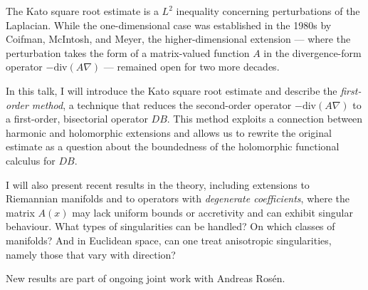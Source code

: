 {%
    The Kato square root estimate is a $L^2$ inequality concerning
    perturbations of the Laplacian. While the one-dimensional case was
    established in the 1980s by Coifman, McIntosh, and Meyer,
    the higher-dimensional extension --- where the perturbation takes the
    form of a matrix-valued function $A$ in the divergence-form operator
    $-\mathrm{div}(A \nabla)$ --- remained open for two more decades.

    In this talk, I will introduce the Kato square root estimate and
    describe the \emph{first-order method}, a technique that reduces the
    second-order operator $-\mathrm{div}(A \nabla)$ to a first-order,
    bisectorial operator $DB$. This method exploits a connection between
    harmonic and holomorphic extensions and allows us to rewrite the
    original estimate as a question about the boundedness of the
    holomorphic functional calculus for $D B$.

    I will also present recent results in the theory, including extensions
    to Riemannian manifolds and to operators with \emph{degenerate
    coefficients}, where the matrix $A(x)$ may lack uniform bounds or
    accretivity and can exhibit singular behaviour. What types of
    singularities can be handled? On which classes of manifolds? And in
    Euclidean space, can one treat anisotropic singularities, namely
    those that vary with direction? 

    New results are part of ongoing joint work with Andreas Rosén.  
}
